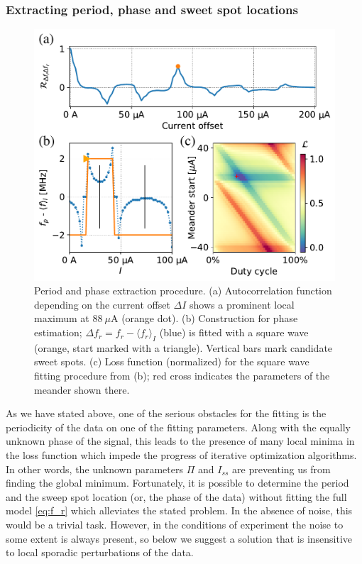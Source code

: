 \documentclass[%
 aip,
 amsmath,amssymb,
 reprint,%
]{revtex4-1}
\begin{document}
\subsubsection{Extracting period, phase and sweet spot locations}
\begin{figure}
\centering
\includegraphics[width=\linewidth]{per+phase}
\caption{Period and phase extraction procedure. (a) Autocorrelation function depending on the current offset $\Delta I$ shows a prominent local maximum at $88\ \mu$A (orange dot). (b) Construction for phase estimation; $\Delta f_r = f_r-\langle f_r \rangle_{I}$ (blue) is fitted with a square wave (orange, start marked with a triangle). Vertical bars mark candidate sweet spots. (c) Loss function (normalized) for the square wave fitting procedure from (b); red cross indicates the parameters of the meander shown there.}
\label{fig:per+phase}
\end{figure}
As we have stated above, one of the serious obstacles for the fitting is the periodicity of the data on one of the fitting parameters. Along with the equally unknown phase of the signal, this leads to the presence of many local minima in the loss function which impede the progress of iterative optimization algorithms. In other words, the unknown parameters $\Pi$ and $I_{ss}$ are preventing us from finding the global minimum. Fortunately, it is possible to determine the period and the sweep spot location (or, the phase of the data) without fitting the full model \eqref{eq:f_r} which alleviates the stated problem. In the absence of noise, this would be a trivial task. However, in the conditions of experiment the noise to some extent is always present, so below we suggest a solution that is insensitive to local sporadic perturbations of the data.
\end{document}

